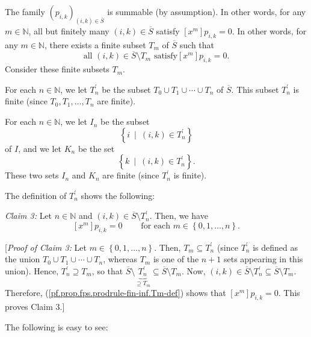 

The family $\left(  p_{i,k}\right)  _{\left(  i,k\right)  \in\overline{S}}$ is
summable (by assumption). In other words, for any $m\in\mathbb{N}$, all but
finitely many $\left(  i,k\right)  \in\overline{S}$ satisfy $\left[
x^{m}\right]  p_{i,k}=0$. In other words, for any $m\in\mathbb{N}$, there
exists a finite subset $T_{m}$ of $\overline{S}$ such that
\begin{equation}
\text{all }\left(  i,k\right)  \in\overline{S}\setminus T_{m}\text{ satisfy
}\left[  x^{m}\right]  p_{i,k}=0. \label{pf.prop.fps.prodrule-fin-inf.Tm-def}%
\end{equation}
Consider these finite subsets $T_{m}$.

For each $n\in\mathbb{N}$, we let $T_{n}^{\prime}$ be the subset $T_{0}\cup
T_{1}\cup\cdots\cup T_{n}$ of $\overline{S}$. This subset $T_{n}^{\prime}$ is
finite (since $T_{0},T_{1},\ldots,T_{n}$ are finite).

For each $n\in\mathbb{N}$, we let $I_{n}$ be the subset
\[
\left\{  i\ \mid\ \left(  i,k\right)  \in T_{n}^{\prime}\right\}
\]
of $I$, and we let $K_{n}$ be the set%
\[
\left\{  k\ \mid\ \left(  i,k\right)  \in T_{n}^{\prime}\right\}  .
\]
These two sets $I_{n}$ and $K_{n}$ are finite (since $T_{n}^{\prime}$ is finite).

The definition of $T_{n}^{\prime}$ shows the following:

\begin{statement}
\textit{Claim 3:} Let $n\in\mathbb{N}$ and $\left(  i,k\right)  \in
\overline{S}\setminus T_{n}^{\prime}$. Then, we have%
\[
\left[  x^{m}\right]  p_{i,k}=0\ \ \ \ \ \ \ \ \ \ \text{for each }%
m\in\left\{  0,1,\ldots,n\right\}  .
\]

\end{statement}

[\textit{Proof of Claim 3:} Let $m\in\left\{  0,1,\ldots,n\right\}  $. Then,
$T_{m}\subseteq T_{n}^{\prime}$ (since $T_{n}^{\prime}$ is defined as the
union $T_{0}\cup T_{1}\cup\cdots\cup T_{n}$, whereas $T_{m}$ is one of the
$n+1$ sets appearing in this union). Hence, $T_{n}^{\prime}\supseteq T_{m}$,
so that $\overline{S}\setminus\underbrace{T_{n}^{\prime}}_{\supseteq T_{m}%
}\subseteq\overline{S}\setminus T_{m}$. Now, $\left(  i,k\right)  \in
\overline{S}\setminus T_{n}^{\prime}\subseteq\overline{S}\setminus T_{m}$.
Therefore, (\ref{pf.prop.fps.prodrule-fin-inf.Tm-def}) shows that $\left[
x^{m}\right]  p_{i,k}=0$. This proves Claim 3.]\medskip

The following is easy to see:

